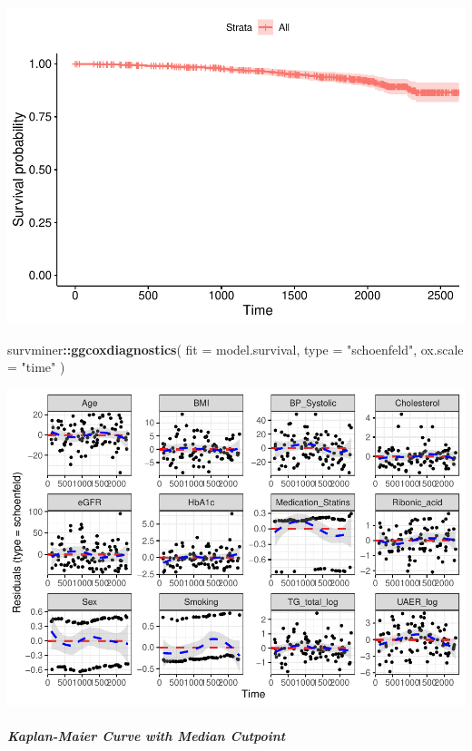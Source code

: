 \documentclass[]{article}
\newenvironment{Shaded}{\begin{snugshade}}{\end{snugshade}}
\newcommand{\DataTypeTok}[1]{\textcolor[rgb]{0.13,0.29,0.53}{#1}}
\newcommand{\KeywordTok}[1]{\textcolor[rgb]{0.13,0.29,0.53}{\textbf{#1}}}
\newcommand{\NormalTok}[1]{#1}
\newcommand{\OperatorTok}[1]{\textcolor[rgb]{0.81,0.36,0.00}{\textbf{#1}}}
\newcommand{\StringTok}[1]{\textcolor[rgb]{0.31,0.60,0.02}{#1}}
\let\oldsubparagraph\subparagraph
\renewcommand{\subparagraph}[1]{\oldsubparagraph{#1}\mbox{}}
\begin{document}
\includegraphics{0033_PROFIL--Metabolomics_files/figure-latex/RA-Mortality-Adjusted-Diagnostics-1.pdf}

\begin{Shaded}
\begin{Highlighting}[]
\NormalTok{survminer}\OperatorTok{::}\KeywordTok{ggcoxdiagnostics}\NormalTok{(}
  \DataTypeTok{fit =}\NormalTok{ model.survival, }
  \DataTypeTok{type =} \StringTok{"schoenfeld"}\NormalTok{, }
  \DataTypeTok{ox.scale =} \StringTok{"time"}
\NormalTok{)}
\end{Highlighting}
\end{Shaded}

\includegraphics{0033_PROFIL--Metabolomics_files/figure-latex/RA-Mortality-Adjusted-Diagnostics-2.pdf}

\newpage

\hypertarget{kaplan-maier-curve-with-median-cutpoint}{%
\subparagraph{Kaplan-Maier Curve with Median
Cutpoint}\label{kaplan-maier-curve-with-median-cutpoint}}
\end{document}
